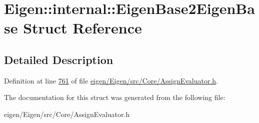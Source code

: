 \hypertarget{struct_eigen_1_1internal_1_1_eigen_base2_eigen_base}{}\section{Eigen\+:\+:internal\+:\+:Eigen\+Base2\+Eigen\+Base Struct Reference}
\label{struct_eigen_1_1internal_1_1_eigen_base2_eigen_base}


\subsection{Detailed Description}


Definition at line \hyperlink{eigen_2_eigen_2src_2_core_2_assign_evaluator_8h_source_l00761}{761} of file \hyperlink{eigen_2_eigen_2src_2_core_2_assign_evaluator_8h_source}{eigen/\+Eigen/src/\+Core/\+Assign\+Evaluator.\+h}.



The documentation for this struct was generated from the following file\+:\begin{DoxyCompactItemize}
\item 
eigen/\+Eigen/src/\+Core/\+Assign\+Evaluator.\+h\end{DoxyCompactItemize}
